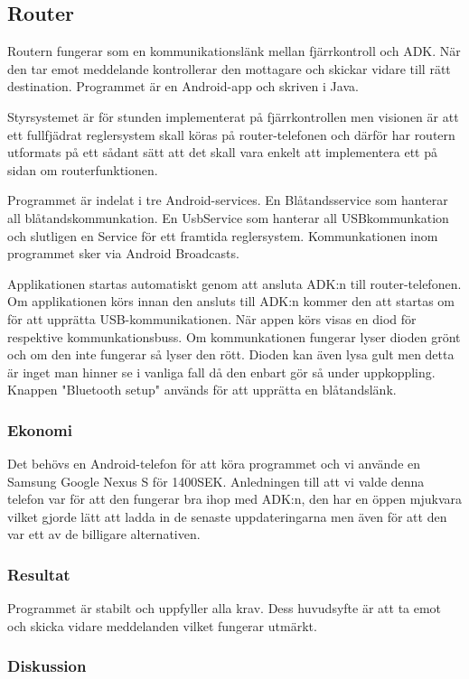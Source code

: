 \subsection{Router}
Routern fungerar som en kommunikationslänk mellan fjärrkontroll och ADK. 
När den tar emot meddelande kontrollerar den mottagare och skickar vidare till rätt destination. 
Programmet är en Android-app och skriven i Java.

Styrsystemet är för stunden implementerat på fjärrkontrollen men visionen är att ett fullfjädrat reglersystem skall 
köras på router-telefonen och därför har routern utformats på ett sådant sätt att det skall vara enkelt att 
implementera ett på sidan om routerfunktionen.

Programmet är indelat i tre Android-services. En Blåtandsservice som hanterar all blåtandskommunkation. 
En UsbService som hanterar all USBkommunkation och slutligen en Service för ett framtida reglersystem.
Kommunkationen inom programmet sker via Android Broadcasts.

Applikationen startas automatiskt genom att ansluta ADK:n till router-telefonen. 
Om applikationen körs innan den ansluts till ADK:n kommer den att startas om för att upprätta USB-kommunikationen. 
När appen körs visas en diod för respektive kommunkationsbuss. Om kommunkationen fungerar lyser dioden grönt och om 
den inte fungerar så lyser den rött. Dioden kan även lysa gult men detta är inget man hinner se i vanliga fall då 
den enbart gör så under uppkoppling. Knappen "Bluetooth setup" används för att upprätta en blåtandslänk.

\subsubsection{Ekonomi}
Det behövs en Android-telefon för att köra programmet och vi använde en Samsung Google Nexus S för 1400SEK. 
Anledningen till att vi valde denna telefon var för att den fungerar bra ihop med ADK:n, den har en öppen 
mjukvara vilket gjorde lätt att ladda in de senaste uppdateringarna men även för att den var ett av de billigare 
alternativen.

\subsubsection{Resultat}
Programmet är stabilt och uppfyller alla krav. Dess huvudsyfte är att ta emot och skicka vidare meddelanden 
vilket fungerar utmärkt.

\subsubsection{Diskussion}